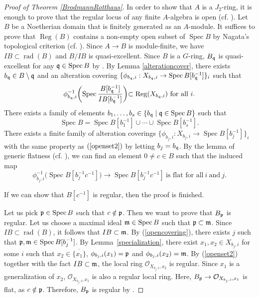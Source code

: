 \documentclass[11pt,a4paper]{amsart}
\theoremstyle{definition}
\theoremstyle{remark}
\newcommand{\Spec}{\operatorname{Spec}}
\newcommand{\rad}{\operatorname{rad}}
\newcommand{\Reg}{\operatorname{Reg}}
\newcommand{\fm}{\frak{m}}
\newcommand{\fp}{\frak{p}}
\newcommand{\fq}{\frak{q}}
\begin{document}
\begin{proof}[Proof of Theorem \ref{BrodmannRotthaus}]
In order to show that $A$ is a $J_2$-ring, it is enough to prove that 
the regular locus of any finite $A$-algebra is open (cf. \cite[Theorem73]{Ma80}). Let $B$ be a Noetherian domain that is finitely generated as an $A$-module. It suffices to prove that $\Reg(B)$ contains a non-empty open subset of $\Spec B$ by Nagata's topological criterion (cf. \cite[Theorem 24.4]{Ma86}). Since $A \to B$ is module-finite, we have $IB \subset \rad(B)$ and $B/IB$ is quasi-excellent. Since $B$ is a $G$-ring, $B_{\fq}$ is quasi-excellent for any $\fq \in \Spec B$
by \cite[Theorem 76]{Ma80}. By Lemma \ref{alterationcover}, there exists $b_{\fq} \in B \setminus \fq$ and an alteration covering $\{\phi_{b_{\fq},i}:X_{b_{\fq},i} \to \Spec B[b_{\fq}^{-1}]\}_i$ such that
\begin{equation}
\label{openset2}
\phi_{b_{\fq},i}^{-1}\biggl(\Spec \frac{B[b_{\fq}^{-1}]}{IB[b_{\fq}^{-1}]}\biggl) \subset 
\Reg(X_{b_{\fq},i})~\mbox{for all}~i.
\end{equation}
There exists a family of elements $b_1,\ldots,b_s \in \{ b_{\fq} \mid \fq \in \Spec B \}$ such that
\begin{equation}
\label{opencovering}
\Spec B=\Spec B[b_1^{-1}] \cup \cdots \cup \Spec B[b_s^{-1}].
\end{equation}
There exists a finite family of alteration coverings $\{\phi_{b_j,i}:X_{b_j,i} \to \Spec B[b_j^{-1}]\}_{i}$ with the same property as $(\ref{openset2})$ by letting $b_j=b_{\fq}$. 
By the lemma of generic flatness (cf. \cite[(22.A)]{Ma80}), we can find an element $0 \ne c \in B$ such that the induced map
\begin{equation*}
\phi_{b_j,i}^{-1}\big(\Spec B[b_j^{-1}c^{-1}]\big) \to \Spec B[b_j^{-1}c^{-1}]~\mbox{is flat for all}~i~\mbox{and}~j.
\end{equation*}

If we can show that $B[c^{-1}]$ is regular, then the proof is finished.

Let us pick $\fp \in \Spec B$ such that $c \notin \fp$. Then we want to prove that $B_{\fp}$ is regular. Let us choose a maximal ideal $\fm  \in \Spec B$ such that $\fp \subset \fm$. Since $IB \subset \rad(B)$, it follows that $IB \subset \fm$. 
By (\ref{opencovering}), there exists $j$ such that $\fp, \fm \in \Spec B[b_j^{-1}]$.
By Lemma~\ref{specialization}, there exist $x_1,x_2 \in X_{b_j,i}$ for some $i$ such that $x_2 \in \overline{\{x_1\}}$, $\phi_{b_j,i}(x_1)=\fp$ and $\phi_{b_j,i}(x_2)=\fm$. 
By (\ref{openset2}) together with the fact $IB \subset \fm$, the local ring $\mathcal{O}_{X_{b_j,i},x_2}$ is regular. Since $x_1$ is a generalization of $x_2$, $\mathcal{O}_{X_{b_j,i},x_1}$ is also a regular local ring. Here, $B_{\fp} \to \mathcal{O}_{X_{b_j,i},x_1}$ is flat, as $c \notin \fp$. Therefore, $B_{\fp}$ is regular by \cite[Proposition~17.3.3 (i)]{EGA20}.
\end{proof}
\end{document}
